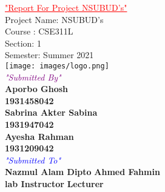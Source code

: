 \documentclass[ 12pt,a4paper,twocolumn,fleqn]{article}
\begin{document}
\chead{}
\onecolumn
\begin{center}
 \vspace{0.5cm}
\smallskip
\textcolor{red}{\LARGE{\underline{"Report For Project NSUBUD's"}}}
 \vspace{ 1 cm}\\
\large{Project Name: NSUBUD's\\Course : CSE311L\\Section: 1\\Semester: Summer 2021 }\\

\texttt{[image: images/logo.png]} \\
\textcolor{purple}{{\textit{"Submitted By"}}}\\
\textbf{Aporbo Ghosh} \\
\textbf{1931458042} \\
\textbf{Sabrina Akter Sabina} \\
\textbf{1931947042} \\
\textbf{Ayesha Rahman} \\
\textbf{1931209042} \\

 \vspace{0.5cm}
\textcolor{blue}{{\textit{"Submitted To"}}}
\\{
\textbf{Nazmul Alam Dipto}
\hfill}
{
\textbf{Ahmed Fahmin}
\hfill
 \\
\textbf{lab Instructor}
\hfill
\textbf{Lecturer}
\hfill
}
\end{center}



\newpage




\tableofcontents














\end{document}
